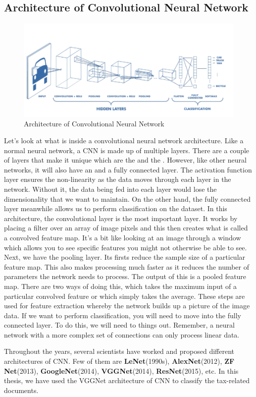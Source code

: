 \subsection{Architecture of Convolutional Neural Network}
\begin{figure}[H]
\centering
\includegraphics[scale=0.7]{images/Chapter2/cnn-arch.png}
\caption{Architecture of Convolutional Neural Network \cite{arch_cnn}}
\label{cnn-arch}
\end{figure}
\par
Let's look at what is inside a convolutional neural network architecture. Like a normal neural network, a CNN is made up of multiple layers. There are a couple of layers that make it unique which are the  and the . However, like other neural networks, it will also have an  and a fully connected layer. The activation function layer ensures the non-linearity as the data moves through each layer in the network. Without it, the data being fed into each layer would lose the dimensionality that we want to maintain. On the other hand, the fully connected layer meanwhile allows us to perform classification on the dataset. In this architecture, the convolutional layer is the most important layer. It works by placing a filter over an array of image pixels and this then creates what is called a convolved feature map. It's a bit like looking at an image through a window which allows you to see specific features you might not otherwise be able to see. Next, we have the pooling layer. Its firsts reduce the sample size of a particular feature map. This also makes processing much faster as it reduces the number of parameters the network needs to process. The output of this is a pooled feature map. There are two ways of doing this,  which takes the maximum input of a particular convolved feature or  which simply takes the average. These steps are used for feature extraction whereby the network builds up a picture of the image data. If we want to perform classification, you will need to move into the fully connected layer. To do this, we will need to  things out. Remember, a neural network with a more complex set of connections can only process linear data.
\newline
\par
Throughout the years, several scientists have worked and proposed different architectures of CNN. Few of them are \textbf{LeNet}(1990s), \textbf{AlexNet}(2012), \textbf{ZF Net}(2013), \textbf{GoogleNet}(2014), \textbf{VGGNet}(2014), \textbf{ResNet}(2015), etc. In this thesis, we have used the VGGNet architecture of CNN to classify the tax-related documents.
